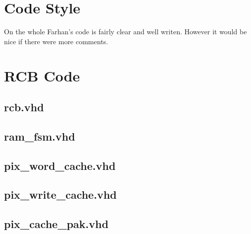 \documentclass[11pt,a4paper]{article}
\begin{document}
\section{Code Style}
On the whole Farhan's code is fairly clear and well writen. However it would be 
nice if there were more comments.

\newpage
\appendix
\section{RCB Code}
\subsection{rcb.vhd}


\newpage
\subsection{ram\_fsm.vhd}


\newpage
\subsection{pix\_word\_cache.vhd}


\newpage
\subsection{pix\_write\_cache.vhd}


\newpage
\subsection{pix\_cache\_pak.vhd}



\end{document}
